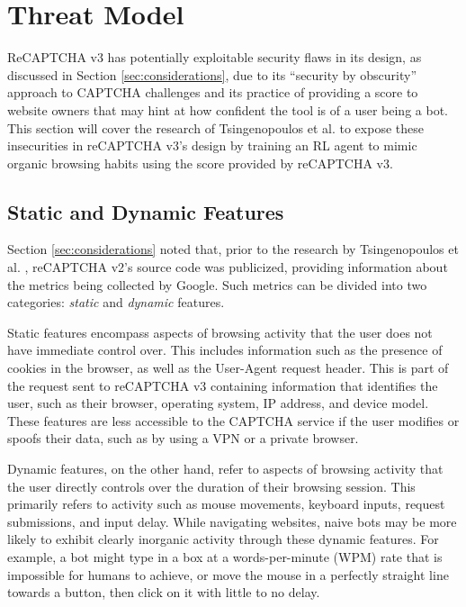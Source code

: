 \documentclass[sigplan,screen,nonacm]{acmart-tagged}
\begin{document}
\section{Threat Model}
\label{sec:breaking}

ReCAPTCHA v3 has potentially exploitable security flaws in its design, as discussed in Section \ref{sec:considerations}, due to its ``security by obscurity'' approach to CAPTCHA challenges and its practice of providing a score to website owners that may hint at how confident the tool is of a user being a bot. This section will cover the research of Tsingenopoulos et al. \cite{tsingen} to expose these insecurities in reCAPTCHA v3's design by training an RL agent to mimic organic browsing habits using the score provided by reCAPTCHA v3.

\subsection{Static and Dynamic Features}
\label{sec:features}

Section \ref{sec:considerations} noted that, prior to the research by Tsingenopoulos et al. \cite{tsingen}, reCAPTCHA v2's source code was publicized, providing information about the metrics being collected by Google. Such metrics can be divided into two categories: \textit{static} and \textit{dynamic} features. 

Static features encompass aspects of browsing activity that the user does not have immediate control over. This includes information such as the presence of cookies in the browser, as well as the User-Agent request header. This is part of the request sent to reCAPTCHA v3 containing information that identifies the user, such as their browser, operating system, IP address, and device model. These features are less accessible to the CAPTCHA service if the user modifies or spoofs their data, such as by using a VPN or a private browser.

Dynamic features, on the other hand, refer to aspects of browsing activity that the user directly controls over the duration of their browsing session. This primarily refers to activity such as mouse movements, keyboard inputs, request submissions, and input delay. While navigating websites, naive bots may be more likely to exhibit clearly inorganic activity through these dynamic features. For example, a bot might type in a box at a words-per-minute (WPM) rate that is impossible for humans to achieve, or move the mouse in a perfectly straight line towards a button, then click on it with little to no delay.
\end{document}
